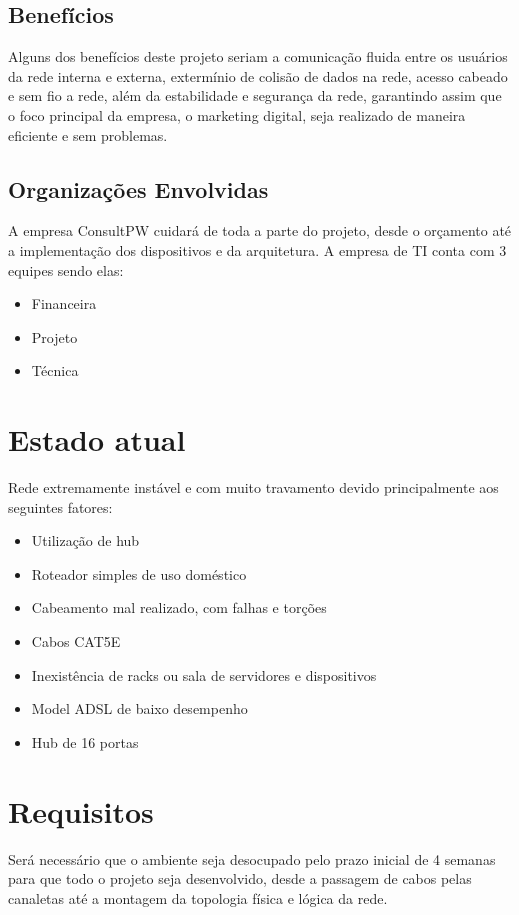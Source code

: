 \documentclass[	DIV=calc,%
							paper=a4,%
							fontsize=12pt,%
							onecolumn]{scrartcl}	 					%
\begin{document}
\subsection{Benefícios}
Alguns dos benefícios deste projeto seriam a comunicação fluida entre os usuários da rede interna e externa, extermínio de colisão de dados na rede, acesso cabeado e sem fio a rede, além da estabilidade e segurança da rede, garantindo assim que o foco principal da empresa, o marketing digital, seja realizado de maneira eficiente e sem problemas.

\subsection{Organizações Envolvidas}
A empresa ConsultPW cuidará de toda a parte do projeto, desde o orçamento até a implementação dos dispositivos e da arquitetura. A empresa de TI conta com 3 equipes sendo elas:

\begin{itemize}
\item Financeira
\item Projeto
\item Técnica
\end{itemize}


\section{Estado atual}
Rede extremamente instável e com muito travamento devido principalmente aos seguintes fatores:

\begin{itemize}
	\item Utilização de hub
	\item Roteador simples de uso doméstico
	\item Cabeamento mal realizado, com falhas e torções
	\item Cabos CAT5E
	\item Inexistência de racks ou sala de servidores e dispositivos
	\item Model ADSL de baixo desempenho
	\item Hub de 16 portas
	
\end{itemize}

\section{Requisitos}
Será necessário que o ambiente seja desocupado pelo prazo inicial de 4 semanas para que todo o projeto seja desenvolvido, desde a passagem de cabos pelas canaletas até a montagem da topologia física e lógica da rede.
\end{document}
